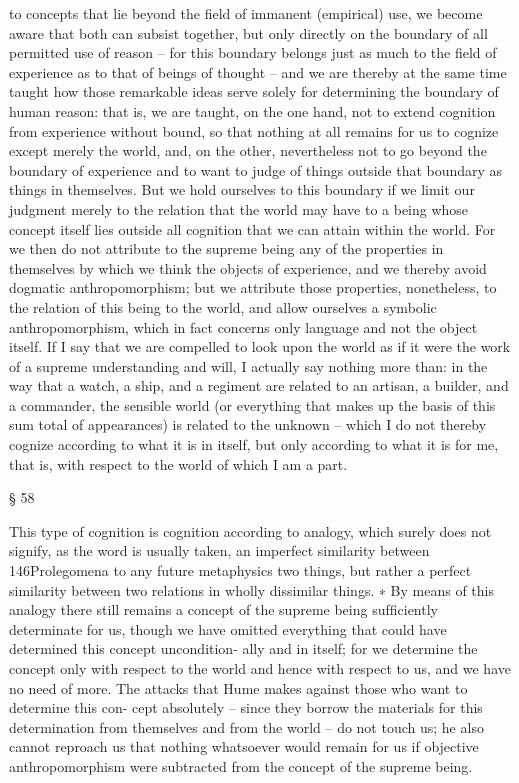to concepts that lie beyond the ﬁeld of immanent (empirical) use, we
become aware that both can subsist together, but only directly on the
boundary of all permitted use of reason – for this boundary belongs just as
much to the ﬁeld of experience as to that of beings of thought – and we
are thereby at the same time taught how those remarkable ideas serve
solely for determining the boundary of human reason: that is, we are
taught, on the one hand, not to extend cognition from experience without
bound, so that nothing at all remains for us to cognize except merely the
world, and, on the other, nevertheless not to go beyond the boundary
of experience and to want to judge of things outside that boundary as
things in themselves.
But we hold ourselves to this boundary if we limit our judgment
merely to the relation that the world may have to a being whose concept
itself lies outside all cognition that we can attain within the world. For
we then do not attribute to the supreme being any of the properties in
themselves by which we think the objects of experience, and we thereby
avoid dogmatic anthropomorphism; but we attribute those properties,
nonetheless, to the relation of this being to the world, and allow ourselves
a symbolic anthropomorphism, which in fact concerns only language and
not the object itself.
If I say that we are compelled to look upon the world as if it were the
work of a supreme understanding and will, I actually say nothing more
than: in the way that a watch, a ship, and a regiment are related to an
artisan, a builder, and a commander, the sensible world (or everything
that makes up the basis of this sum total of appearances) is related to the
unknown – which I do not thereby cognize according to what it is in
itself, but only according to what it is for me, that is, with respect to the
world of which I am a part.

§ 58

This type of cognition is cognition according to analogy, which surely does
not signify, as the word is usually taken, an imperfect similarity between
146Prolegomena to any future metaphysics
two things, but rather a perfect similarity between two relations in wholly
dissimilar things. ∗ By means of this analogy there still remains a concept
of the supreme being sufﬁciently determinate for us, though we have
omitted everything that could have determined this concept uncondition-
ally and in itself; for we determine the concept only with respect to the
world and hence with respect to us, and we have no need of more. The
attacks that Hume makes against those who want to determine this con-
cept absolutely – since they borrow the materials for this determination
from themselves and from the world – do not touch us; he also cannot
reproach us that nothing whatsoever would remain for us if objective
anthropomorphism were subtracted from the concept of the supreme
being.

